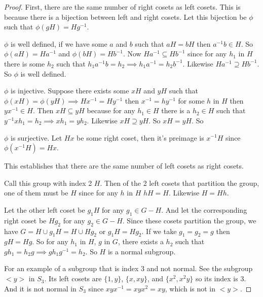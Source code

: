 \documentclass[12pt]{article}
\begin{document}
\begin{proof}

    First, there are the same number of right cosets as left cosets.
    This is because there is a bijection between left and right cosets. 
    Let this bijection be $\phi$  such that $\phi(gH) = Hg^{-1}$.

    $\phi$ is well defined, if we have some $a$ and $b$ such that $aH =
    bH$ then $a^{-1} b \in H$. So $\phi(aH) = Ha^{-1}$ and $\phi(bH) =
    Hb^{-1}$. Now $Ha^{-1} \subseteq Hb^{-1}$ since for any $h_1$ in $H$
    there is some $h_2$ such that $h_1 a^{-1}b = h_2 \implies h_1 a^{-1}
    = h_2 b^{-1}$. Likewise $Ha^{-1} \supseteq Hb^{-1}$. So $\phi$ is
    well defined.

    $\phi$ is injective. Suppose there exists some $xH$ and $yH$ such
    that $\phi(xH) = \phi(yH) \implies Hx^{-1} = Hy^{-1}$ then $x^{-1} =
    hy^{-1}$ for some $h$ in $H$ then $yx^{-1} \in H$. Then $xH
    \subseteq yH$ because for any $h_1 \in H$ there is a $h_2 \in H$
    such that $y^{-1}xh_1 = h_2 \implies xh_1 = yh_2$. Likewise $xH
    \supseteq yH$. So $xH = yH$. So 

    $\phi$ is surjective. Let $Hx$ be some right coset, then it's
    preimage is $x^{-1}H$ since $\phi(x^{-1}H) = Hx$.

    This establishes that there are the same number of left cosets as
    right cosets. 

    Call this group with index 2 $H$. Then of the 2 left cosets
    that partition the group, one of them must be $H$ since for any $h$
    in $H$ $hH = H$. Likewise $H = Hh$. 

    Let the other left coset be $g_1 H$ for any $g_1 \in G - H$. And let
    the corresponding right coset be $H g_2$ for any $g_2 \in G - H$.
    Since these cosets partition the group, we have $G = H \cup g_1 H =
    H \cup Hg_2$ or $g_1 H = H g_2$. If we take $g_1 = g_2 = g$ then $gH
    = Hg$. So for any $h_1$ in $H$, $g$ in $G$, there exists a $h_2$
    such that $gh_1 = h_2 g \implies gh_1 g^{-1} = h_2$. So $H$ is a
    normal subgroup.
    
    For an example of a subgroup that is index 3 and not normal. See the
    subgroup $<y>$ in $S_3$. Its left cosets are $\{1, y\}$, $\{x,
    xy\}$, and $\{x^2, x^2y\}$ so its index is 3. And it is not normal
    in $S_3$ since $xyx^{-1} = xyx^2 = xy$, which is not in $<y>$.

\end{proof}

\end{document}
